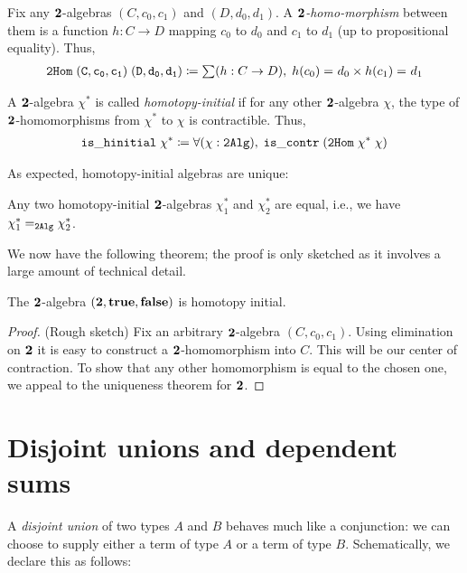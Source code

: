 \begin{defn}
Fix any $\two$-algebras $(C,c_0,c_1)$ and $(D,d_0,d_1)$. A \emph{$\two$-homo-morphism} between them is a function $h : C \to D$ mapping $c_0$ to $d_0$ and
$c_1$ to $d_1$ (up to propositional equality). Thus,
\begin{align*}
\mathtt{2Hom \; (C,c_0,c_1) \; (D,d_0,d_1)} \defeq \sm {h : C \to D} \; \id{h(c_0)}{d_0} \times \id{h(c_1)}{d_1}
\end{align*}
\end{defn}

\begin{defn}
A $\two$-algebra $\chi^*$ is called \emph{homotopy-initial} if for any other $\two$-algebra $\chi$, the type of $\two$-homomorphisms from $\chi^*$ to $\chi$ is contractible. Thus,
\begin{align*}
\mathtt{is\_hinitial \; \chi^* \defeq \fall{\chi : 2Alg} \; is\_contr \; (2Hom \; \chi^*\; \chi)}
\end{align*}
\end{defn}

As expected, homotopy-initial algebras are unique:
\begin{thm}
Any two homotopy-initial $\two$-algebras $\chi^*_1$ and $\chi^*_2$ are equal, i.e., we have $\id[\mathtt{2Alg}]{\chi_1^*}{\chi_2^*}$.
\end{thm}


We now have the following theorem; the proof is only sketched as it involves a large amount of technical detail.
\begin{thm}
The $\two$-algebra $(\two, \true, \false)$ is homotopy initial.
\end{thm}
\begin{proof}
(Rough sketch) Fix an arbitrary $\two$-algebra $(C,c_0,c_1)$. Using elimination on $\two$ it is easy to construct a $\two$-homomorphism into $C$. This will be our
center of contraction. To show that any other homomorphism is equal to the chosen one, we appeal to the uniqueness theorem for $\two$.
\end{proof}

\section{Disjoint unions and dependent sums}
A \emph{disjoint union} of two types $A$ and $B$ behaves much like a conjunction: we can choose to supply either a term of type $A$ or a term of type $B$. Schematically, we declare this as follows:

